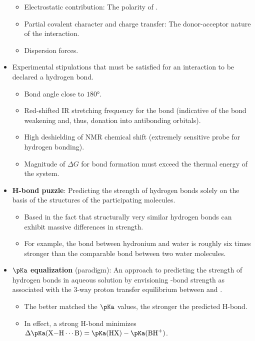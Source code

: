 \documentclass[../notes.tex]{subfiles}
\begin{document}
\begin{itemize}
    \begin{itemize}
        \item Electrostatic contribution: The polarity of .
        \item Partial covalent character and charge transfer: The donor-acceptor nature of the interaction.
        \item Dispersion forces.
    \end{itemize}
    \item Experimental stipulations that must be satisfied for an interaction to be declared a hydrogen bond.
    \begin{itemize}
        \item Bond angle close to $\ang{180}$.
        \item Red-shifted IR stretching frequency for the  bond (indicative of the bond weakening and, thus, donation into antibonding orbitals).
        \item High deshielding of NMR chemical shift (extremely sensitive probe for hydrogen bonding).
        \item Magnitude of $\Delta G$ for bond formation must exceed the thermal energy of the system.
    \end{itemize}
    \item \textbf{H-bond puzzle}: Predicting the strength of hydrogen bonds solely on the basis of the structures of the participating molecules.
    \begin{itemize}
        \item Based in the fact that structurally very similar hydrogen bonds can exhibit massive differences in strength.
        \item For example, the  bond between hydronium and water is roughly six times stronger than the comparable bond between two water molecules.
    \end{itemize}
    \item \textbf{$\pKa$ equalization} (paradigm): An approach to predicting the strength of hydrogen bonds in aqueous solution by envisioning -bond strength as associated with the 3-way proton transfer equilibrium between  and .
    \begin{itemize}
        \item The better matched the $\pKa$ values, the stronger the predicted H-bond.
        \item In effect, a strong H-bond minimizes $\Delta\pKa(\ce{X-H\cdots B})=\pKa(\ce{HX})-\pKa(\ce{BH+})$.
    \end{itemize}

\end{itemize}
\end{document}
